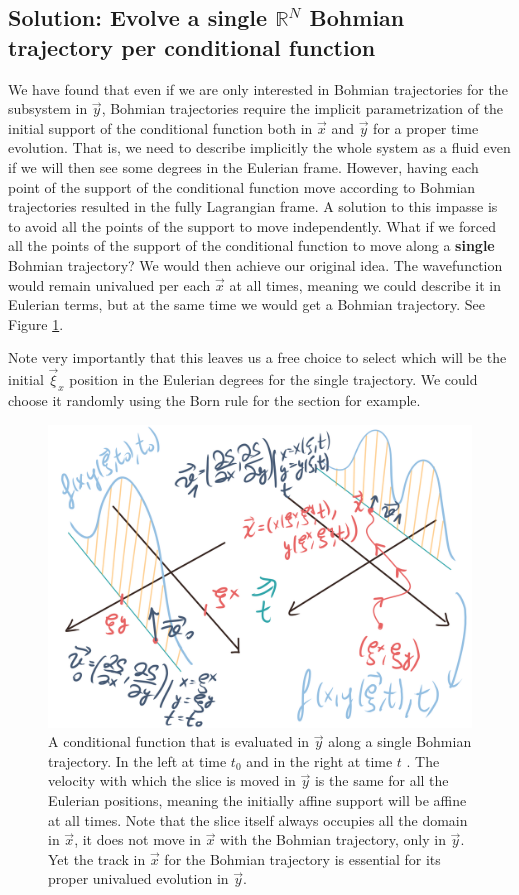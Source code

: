 \documentclass[11pt, a4paper]{article} %
\newcommand{\R}{\mathbb{R}} %
\DeclareRobustCommand{\mybox}[2][gray!10]{%
\begin{tcolorbox}[   %
        left=0.2cm,
        right=0.2cm,
        top=0.15cm,
        bottom=0.15cm,
        colback=#1,
        colframe=#1,
        width=\dimexpr\textwidth\relax, 
        enlarge left by=0mm,
        boxsep=5pt,
        arc=0pt,outer arc=0pt,
        ]
        #2
\end{tcolorbox}
}
\begin{document}
\mybox{
\subsection*{Solution: Evolve a single $\R^N$ Bohmian trajectory per conditional function}
We have found that even if we are only interested in Bohmian trajectories for the subsystem in $\vec{y}$, Bohmian trajectories require the implicit parametrization of the initial support of the conditional function both in $\vec{x}$ and $\vec{y}$ for a proper time evolution. That is, we need to describe implicitly the whole system as a fluid even if we will then see some degrees in the Eulerian frame. However, having each point of the support of the conditional function move according to Bohmian trajectories resulted in the fully Lagrangian frame. A solution to this impasse is to avoid all the points of the support to move independently. What if we forced all the points of the support of the conditional function to move along a {\bf single} Bohmian trajectory? We would then achieve our original idea. The wavefunction would remain univalued per each $\vec{x}$ at all times, meaning we could describe it in Eulerian terms, but at the same time we would get a Bohmian trajectory. See Figure \ref{fig:singleTraj}. 

Note very importantly that this leaves us a free choice to select which will be the initial $\vec{\xi}_x$ position in the Eulerian degrees for the single trajectory. We could choose it randomly using the Born rule for the section for example.

}
\begin{figure}[h!]
  \centering
    \includegraphics[width=0.64\linewidth]{moving_bohmian.png}
  \caption{A conditional function that is evaluated in $\vec{y}$ along a single Bohmian trajectory. In the left at time $t_0$ and in the right at time $t$ . The velocity with which the slice is moved in $\vec{y}$ is the same for all the Eulerian positions, meaning the initially affine support will be affine at all times. Note that the slice itself always occupies all the domain in $\vec{x}$, it does not move in $\vec{x}$ with the Bohmian trajectory, only in $\vec{y}$. Yet the track in $\vec{x}$ for the Bohmian trajectory is essential for its proper univalued evolution in $\vec{y}$. }
  \label{fig:singleTraj}
\end{figure}
\end{document}
